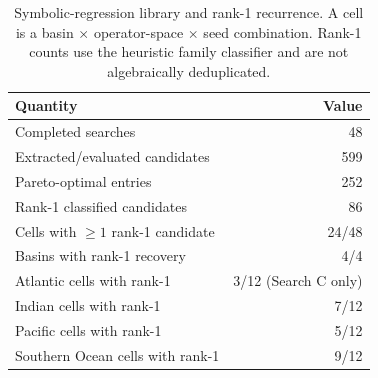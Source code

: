 \begin{table}[htbp]
\centering
\caption{Symbolic-regression library and rank-1 recurrence. A cell is a basin $\times$ operator-space $\times$ seed combination. Rank-1 counts use the heuristic family classifier and are not algebraically deduplicated.}
\label{tab:recurrence}
\begin{tabular}{lr}
\toprule
Quantity & Value \\
\midrule
Completed searches & 48 \\
Extracted/evaluated candidates & 599 \\
Pareto-optimal entries & 252 \\
Rank-1 classified candidates & 86 \\
Cells with $\ge 1$ rank-1 candidate & 24/48 \\
Basins with rank-1 recovery & 4/4 \\
Atlantic cells with rank-1 & 3/12 (Search C only) \\
Indian cells with rank-1 & 7/12 \\
Pacific cells with rank-1 & 5/12 \\
Southern Ocean cells with rank-1 & 9/12 \\
\bottomrule
\end{tabular}
\end{table}
